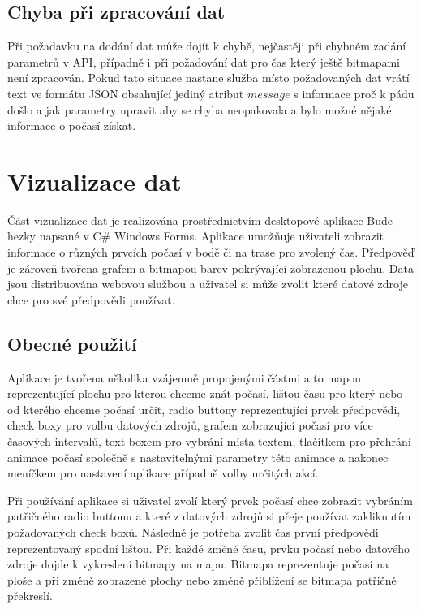 \documentclass[czech,bachelor,dept460,male,csharp,cpdeclaration]{diploma}
\begin{document}
	\section{Chyba při zpracování dat}
	
	Při požadavku na dodání dat může dojít k chybě, nejčastěji při chybném zadání parametrů v API, případně i při požadování dat pro čas který ještě bitmapami není zpracován. Pokud tato situace nastane služba místo požadovaných dat vrátí text ve formátu JSON obsahující jediný atribut $message$ s informace proč k pádu došlo a jak parametry upravit aby se chyba neopakovala a bylo možné nějaké informace o počasí získat.
	
	\chapter{Vizualizace dat}
	
	Část vizualizace dat je realizována prostřednictvím desktopové aplikace Bude-hezky napsané v C\# Windows Forms. Aplikace umožňuje uživateli zobrazit informace o různých prvcích počasí v bodě či na trase pro zvolený čas. Předpověď je zároveň tvořena grafem a bitmapou barev pokrývající zobrazenou plochu. Data jsou distribuována webovou službou a uživatel si může zvolit které datové zdroje chce pro své předpovědi používat.
	
	\section{Obecné použití}
	
	Aplikace je tvořena několika vzájemně propojenými částmi a to mapou reprezentující plochu pro kterou chceme znát počasí, lištou času pro který nebo od kterého chceme počasí určit, radio buttony reprezentující prvek předpovědi, check boxy pro volbu datových zdrojů, grafem zobrazující počasí pro více časových intervalů, text boxem pro vybrání místa textem, tlačítkem pro přehrání animace počasí společně s nastavitelnými parametry této animace a nakonec meníčkem pro nastavení aplikace případně volby určitých akcí.
	
	Při používání aplikace si uživatel zvolí který prvek počasí chce zobrazit vybráním patřičného radio buttonu a které z datových zdrojů si přeje používat zakliknutím požadovaných check boxů. Následně je potřeba zvolit čas první předpovědi reprezentovaný spodní lištou. Při každé změně času, prvku počasí nebo datového zdroje dojde k vykreslení bitmapy na mapu. Bitmapa reprezentuje počasí na ploše a při změně zobrazené plochy nebo změně přiblížení se bitmapa patřičně překreslí.
	
\end{document}
